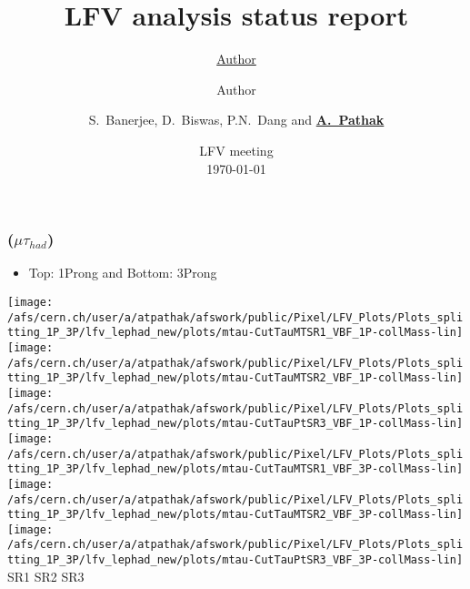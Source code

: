 \documentclass{beamer}
\title{LFV analysis status report} %
\author{\underline{Author} \and Author} %
\author{S.~Banerjee, D.~Biswas, P.N.~Dang and \textbf{\underline{A.~Pathak}}}
\institute{\begin{minipage}{0.5\textwidth}\centering
\texttt{[image: /afs/cern.ch/user/s/swaban/public/university-of-louisville-logo.png]}
\end{minipage}}
\date{{LFV meeting}\\\today\\} %
\begin{document}
\begin{frame}
\frametitle{($\mu\tau_{had}$)}
\begin{normalsize}
\begin{itemize}
\item Top: 1Prong and Bottom: 3Prong
\end{itemize}
\vspace*{0.5cm}
\texttt{[image: /afs/cern.ch/user/a/atpathak/afswork/public/Pixel/LFV\_Plots/Plots\_splitting\_1P\_3P/lfv\_lephad\_new/plots/mtau-CutTauMTSR1\_VBF\_1P-collMass-lin]}
\texttt{[image: /afs/cern.ch/user/a/atpathak/afswork/public/Pixel/LFV\_Plots/Plots\_splitting\_1P\_3P/lfv\_lephad\_new/plots/mtau-CutTauMTSR2\_VBF\_1P-collMass-lin]}
\texttt{[image: /afs/cern.ch/user/a/atpathak/afswork/public/Pixel/LFV\_Plots/Plots\_splitting\_1P\_3P/lfv\_lephad\_new/plots/mtau-CutTauPtSR3\_VBF\_1P-collMass-lin]}\\
\vspace*{0.5cm}
\texttt{[image: /afs/cern.ch/user/a/atpathak/afswork/public/Pixel/LFV\_Plots/Plots\_splitting\_1P\_3P/lfv\_lephad\_new/plots/mtau-CutTauMTSR1\_VBF\_3P-collMass-lin]}
\texttt{[image: /afs/cern.ch/user/a/atpathak/afswork/public/Pixel/LFV\_Plots/Plots\_splitting\_1P\_3P/lfv\_lephad\_new/plots/mtau-CutTauMTSR2\_VBF\_3P-collMass-lin]}
\texttt{[image: /afs/cern.ch/user/a/atpathak/afswork/public/Pixel/LFV\_Plots/Plots\_splitting\_1P\_3P/lfv\_lephad\_new/plots/mtau-CutTauPtSR3\_VBF\_3P-collMass-lin]}\\
\hspace{0.5in}SR1
\hspace{0.75in}SR2
\hspace{0.75in}SR3
\end{normalsize}
\end{frame}
\end{document}

